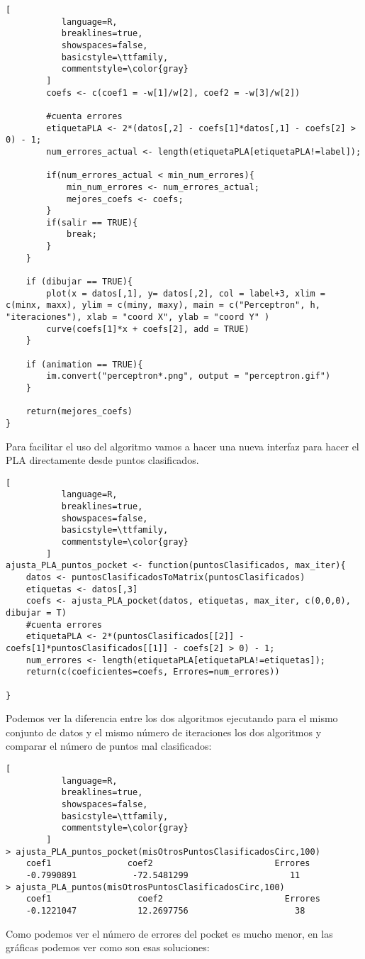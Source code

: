 \documentclass[11pt,fleqn]{book} %
\begin{document}
\begin{lstlisting}[
           language=R,
           breaklines=true,
           showspaces=false,
           basicstyle=\ttfamily,
           commentstyle=\color{gray}
        ]
        coefs <- c(coef1 = -w[1]/w[2], coef2 = -w[3]/w[2])
        
        #cuenta errores
        etiquetaPLA <- 2*(datos[,2] - coefs[1]*datos[,1] - coefs[2] > 0) - 1;
        num_errores_actual <- length(etiquetaPLA[etiquetaPLA!=label]);
        
        if(num_errores_actual < min_num_errores){
            min_num_errores <- num_errores_actual;
            mejores_coefs <- coefs;
        }
        if(salir == TRUE){
            break;
        }
    }
    
    if (dibujar == TRUE){
        plot(x = datos[,1], y= datos[,2], col = label+3, xlim = c(minx, maxx), ylim = c(miny, maxy), main = c("Perceptron", h, "iteraciones"), xlab = "coord X", ylab = "coord Y" )
        curve(coefs[1]*x + coefs[2], add = TRUE)
    }
    
    if (animation == TRUE){
        im.convert("perceptron*.png", output = "perceptron.gif")
    }
    
    return(mejores_coefs)
}
\end{lstlisting}

Para facilitar el uso del algoritmo vamos a hacer una nueva interfaz para hacer el PLA directamente desde puntos clasificados.

\begin{lstlisting}[
           language=R,
           breaklines=true,
           showspaces=false,
           basicstyle=\ttfamily,
           commentstyle=\color{gray}
        ]
ajusta_PLA_puntos_pocket <- function(puntosClasificados, max_iter){
    datos <- puntosClasificadosToMatrix(puntosClasificados)
    etiquetas <- datos[,3]
    coefs <- ajusta_PLA_pocket(datos, etiquetas, max_iter, c(0,0,0), dibujar = T)
    #cuenta errores
    etiquetaPLA <- 2*(puntosClasificados[[2]] - coefs[1]*puntosClasificados[[1]] - coefs[2] > 0) - 1;
    num_errores <- length(etiquetaPLA[etiquetaPLA!=etiquetas]);
    return(c(coeficientes=coefs, Errores=num_errores))
    
}
\end{lstlisting}

Podemos ver la diferencia entre los dos algoritmos ejecutando para el mismo conjunto de datos y el mismo número de iteraciones los dos algoritmos y comparar el número de puntos mal clasificados:

\begin{lstlisting}[
           language=R,
           breaklines=true,
           showspaces=false,
           basicstyle=\ttfamily,
           commentstyle=\color{gray}
        ]
> ajusta_PLA_puntos_pocket(misOtrosPuntosClasificadosCirc,100)
	coef1 				coef2                        Errores 
	-0.7990891           -72.5481299                    11
> ajusta_PLA_puntos(misOtrosPuntosClasificadosCirc,100)
	coef1	 			  coef2                        Errores 
	-0.1221047            12.2697756                     38
\end{lstlisting}
Como podemos ver el número de errores del pocket es mucho menor, en las gráficas podemos ver como son esas soluciones:
	
\end{document}
